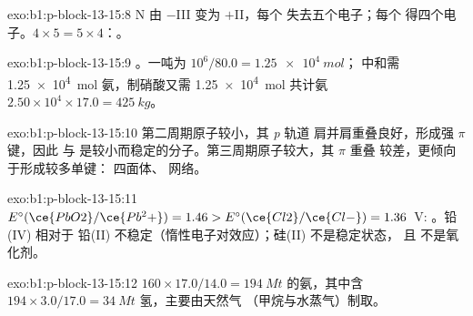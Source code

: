 \begin{solution}{exo:b1:p-block-13-15:8}
N 由 $-$III 变为 $+$II，每个  失去五个电子；每个 
得四个电子。$4 \times 5 = 5 \times 4$：。
\end{solution}

\begin{solution}{exo:b1:p-block-13-15:9}
。一吨为 $10^6/80.0 = \qty{1.25e4}{mol}$；
中和需 \qty{1.25e4}{mol} 氨，制硝酸又需 \qty{1.25e4}{mol}
共计氨 $2.50 \times 10^4 \times 17.0 = \qty{425}{kg}$。
\end{solution}

\begin{solution}{exo:b1:p-block-13-15:10}
第二周期原子较小，其 \textit{p} 轨道
肩并肩重叠良好，形成强 $\pi$ 键，因此  与 
是较小而稳定的分子。第三周期原子较大，其 $\pi$ 重叠
较差，更倾向于形成较多单键： 四面体、
 网络。
\end{solution}

\begin{solution}{exo:b1:p-block-13-15:11}
$E^\circ(\ce{PbO2}/\ce{Pb^2+}) = 1.46 > E^\circ(\ce{Cl2}/\ce{Cl-}) = 1.36$~V:
。铅(IV) 相对于
铅(II) 不稳定（惰性电子对效应）；硅(II) 不是稳定状态，
且  不是氧化剂。
\end{solution}

\begin{solution}{exo:b1:p-block-13-15:12}
$160 \times 17.0/14.0 = \qty{194}{Mt}$ 的氨，其中含 $194 \times
3.0/17.0 = \qty{34}{Mt}$ 氢，主要由天然气
（甲烷与水蒸气）制取。
\end{solution}

